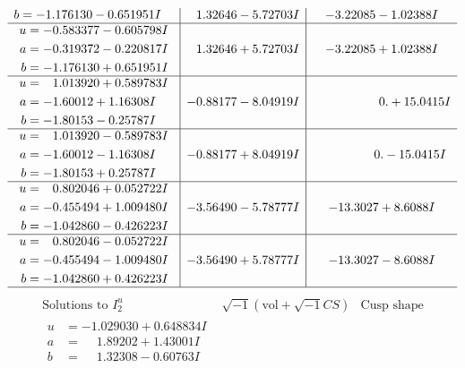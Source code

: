 \documentclass[1p]{elsarticle_modified}
\theoremstyle{definition}
\newcommand{\I}{\sqrt{-1}}
\begin{document}
$$\begin{array}{c|c|c}
\begin{aligned}
b &= -1.176130 - 0.651951 I\end{aligned}
 & \phantom{-}1.32646 - 5.72703 I & -3.22085 - 1.02388 I \\ \hline\begin{aligned}
u &= -0.583377 - 0.605798 I \\
a &= -0.319372 - 0.220817 I \\
b &= -1.176130 + 0.651951 I\end{aligned}
 & \phantom{-}1.32646 + 5.72703 I & -3.22085 + 1.02388 I \\ \hline\begin{aligned}
u &= \phantom{-}1.013920 + 0.589783 I \\
a &= -1.60012 + 1.16308 I \\
b &= -1.80153 - 0.25787 I\end{aligned}
 & -0.88177 - 8.04919 I & \phantom{-0.000000 -}0. + 15.0415 I \\ \hline\begin{aligned}
u &= \phantom{-}1.013920 - 0.589783 I \\
a &= -1.60012 - 1.16308 I \\
b &= -1.80153 + 0.25787 I\end{aligned}
 & -0.88177 + 8.04919 I & \phantom{-0.000000 } 0. - 15.0415 I \\ \hline\begin{aligned}
u &= \phantom{-}0.802046 + 0.052722 I \\
a &= -0.455494 + 1.009480 I \\
b &= -1.042860 - 0.426223 I\end{aligned}
 & -3.56490 - 5.78777 I & -13.3027 + 8.6088 I \\ \hline\begin{aligned}
u &= \phantom{-}0.802046 - 0.052722 I \\
a &= -0.455494 - 1.009480 I \\
b &= -1.042860 + 0.426223 I\end{aligned}
 & -3.56490 + 5.78777 I & -13.3027 - 8.6088 I\\
 \hline 
 \end{array}$$\newpage$$\begin{array}{c|c|c}  
\text{Solutions to }I^u_{2}& \I (\text{vol} + \sqrt{-1}CS) & \text{Cusp shape}\\
 \hline 
\begin{aligned}
u &= -1.029030 + 0.648834 I \\
a &= \phantom{-}1.89202 + 1.43001 I \\
b &= \phantom{-}1.32308 - 0.60763 I\end{aligned}

\end{array}$$
\end{document}
